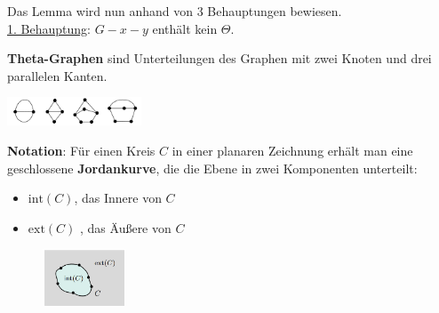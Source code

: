 Das Lemma wird nun anhand von 3 Behauptungen bewiesen.\\

\underline{1. Behauptung}: $G-x-y$ enthält kein $\Theta$.

\textbf{Theta-Graphen} sind Unterteilungen des Graphen mit zwei Knoten und drei parallelen Kanten.
\begin{center}
	\includegraphics[width=0.3\textwidth]{images/theta.png}
\end{center}
\pagebreak


\textbf{Notation}: Für einen Kreis $C$ in einer planaren Zeichnung erhält man eine geschlossene \textbf{Jordankurve}, die die Ebene in zwei Komponenten unterteilt:
\begin{itemize}
	\item $\text{int}(C)$, das Innere von $C$
	\item $\text{ext}(C)$ , das Äußere von $C$
\end{itemize}
\begin{figure}
	\centering
	\vspace{-70pt}
	\includegraphics[width=0.22\textwidth]{images/jordan.png}
	\vspace{40pt}
	\vspace{-60pt}
\end{figure}

